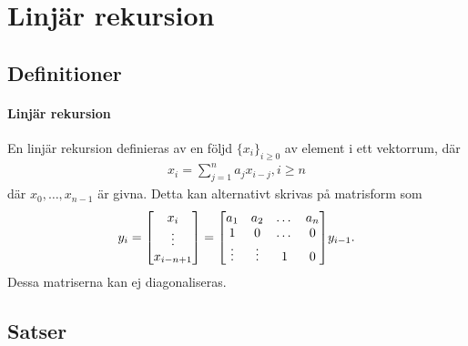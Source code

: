 \section{Linjär rekursion}

\subsection{Definitioner}

\paragraph{Linjär rekursion}
En linjär rekursion definieras av en följd $\{x_{i}\}_{i \geq 0}$ av element i ett vektorrum, där
\begin{align*}
	x_{i} = \sum\limits_{j = 1}^{n}a_{j}x_{i - j}, i\geq n
\end{align*}
där $x_{0}, \dots, x_{n - 1}$ är givna. Detta kan alternativt skrivas på matrisform som
\begin{align*}
	y_{i} =
	\mqty[
		x_{i} \\
		\vdots \\
		x_{i - n + 1}
	]
	=
	\mqty[
		a_{1}  & a_{2}  & \dots  & a_{n} \\
		1      & 0      & \dots  & 0 \\
		\vdots & \vdots & 1      & 0
	]
	y_{i - 1}.
\end{align*}
Dessa matriserna kan ej diagonaliseras.

\subsection{Satser}